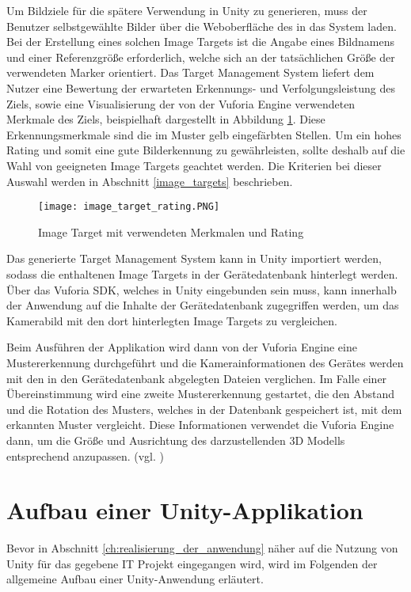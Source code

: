 Um Bildziele für die spätere Verwendung in Unity zu generieren, muss der Benutzer selbstgewählte Bilder über die Weboberfläche des  in das System laden.
Bei der Erstellung eines solchen Image Targets ist die Angabe eines Bildnamens und einer Referenzgröße erforderlich, welche sich an der tatsächlichen Größe der verwendeten Marker orientiert.
Das Target Management System liefert dem Nutzer eine Bewertung der erwarteten Erkennungs- und Verfolgungsleistung des Ziels, sowie eine Visualisierung der von der Vuforia Engine verwendeten Merkmale des Ziels, beispielhaft dargestellt in Abbildung \ref{fig:image_target_rating}. 
Diese Erkennungsmerkmale sind die im Muster gelb eingefärbten Stellen.
Um ein hohes Rating und somit eine gute Bilderkennung zu gewährleisten, sollte deshalb auf die Wahl von geeigneten Image Targets geachtet werden.
Die Kriterien bei dieser Auswahl werden in Abschnitt \ref{image_targets} beschrieben.

\begin{figure} [h]
\centering
\texttt{[image: image\_target\_rating.PNG]}
\caption{Image Target mit verwendeten Merkmalen und Rating}
\label{fig:image_target_rating}
\end{figure}
 
Das generierte Target Management System kann in Unity importiert werden, sodass die enthaltenen Image Targets in der Gerätedatenbank hinterlegt werden. 
Über das Vuforia SDK, welches in Unity eingebunden sein muss, kann innerhalb der Anwendung auf die Inhalte der Gerätedatenbank zugegriffen werden, um das Kamerabild mit den dort hinterlegten Image Targets zu vergleichen.

Beim Ausführen der Applikation wird dann von der Vuforia Engine eine Mustererkennung durchgeführt und die Kamerainformationen des Gerätes werden mit den in den Gerätedatenbank abgelegten Dateien verglichen. 
Im Falle einer Übereinstimmung wird eine zweite Mustererkennung gestartet, die den Abstand und die Rotation des Musters, welches in der Datenbank gespeichert ist, mit dem erkannten Muster vergleicht.
Diese Informationen verwendet die Vuforia Engine dann, um die Größe und Ausrichtung des darzustellenden 3D Modells entsprechend anzupassen. (vgl. \cite{Grahn2017})
\section{Aufbau einer Unity-Applikation}
Bevor in Abschnitt \ref{ch:realisierung_der_anwendung} näher auf die Nutzung von Unity für das gegebene IT Projekt eingegangen wird, wird im Folgenden der allgemeine Aufbau einer Unity-Anwendung erläutert. 

